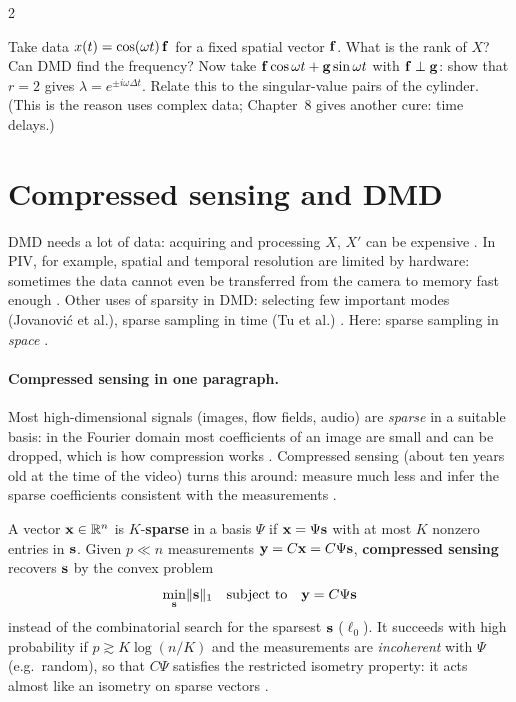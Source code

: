 \begin{paracol}{2}
\begin{exercise}
Take data $x(t)=\cos(\omega t)\,\mathbf{f}$ for a fixed spatial vector $\mathbf{f}$. What is the rank of $X$? Can
DMD find the frequency? Now take $\mathbf{f}\cos\omega t+\mathbf{g}\sin\omega t$ with $\mathbf{f}\perp\mathbf{g}$: show that
$r=2$ gives $\lambda=e^{\pm i\omega\Delta t}$. Relate this to the singular-value pairs of the cylinder.
(This is the reason  uses complex data; Chapter~8 gives another cure: time delays.)
\end{exercise}

\section{Compressed sensing and DMD}\label{sec:dmd-cs}

DMD needs a lot of data: acquiring and processing $X$, $X'$ can be expensive .
In PIV, for example, spatial and temporal resolution are limited by hardware: sometimes the data cannot
even be transferred from the camera to memory fast enough . Other uses of
sparsity in DMD: selecting few important modes (Jovanovi\'c et al.), sparse sampling in time (Tu et al.)
. Here: sparse sampling in \emph{space} .

\paragraph{Compressed sensing in one paragraph.} Most high-dimensional signals (images, flow fields,
audio) are \emph{sparse} in a suitable basis: in the Fourier domain most coefficients of an image are small
and can be dropped, which is how compression works .
Compressed sensing (about ten years old at the time of the video) turns this around: measure much less
and infer the sparse coefficients consistent with the measurements .

\begin{definition}\label{def:dmd-cs}
A vector $\mathbf{x}\in\mathbb{R}^n$ is $K$-\textbf{sparse} in a basis $\Psi$ if $\mathbf{x}=\Psi\mathbf{s}$ with at most $K$
nonzero entries in $\mathbf{s}$. Given $p\ll n$ measurements $\mathbf{y}=C\mathbf{x}=C\Psi\mathbf{s}$,
\textbf{compressed sensing} recovers $\mathbf{s}$ by the convex problem
\begin{equation}\label{eq:dmd-l1}
  \min_{\mathbf{s}}\lVert\mathbf{s}\rVert_1\quad\text{subject to}\quad\mathbf{y}=C\Psi\mathbf{s}
\end{equation}
instead of the combinatorial search for the sparsest $\mathbf{s}$ ($\ell_0$). It succeeds with high probability
if $p\gtrsim K\log(n/K)$ and the measurements are \emph{incoherent} with $\Psi$ (e.g.\ random), so that
$C\Psi$ satisfies the restricted isometry property: it acts almost like an isometry on sparse vectors
.
\end{definition}


\end{paracol}
